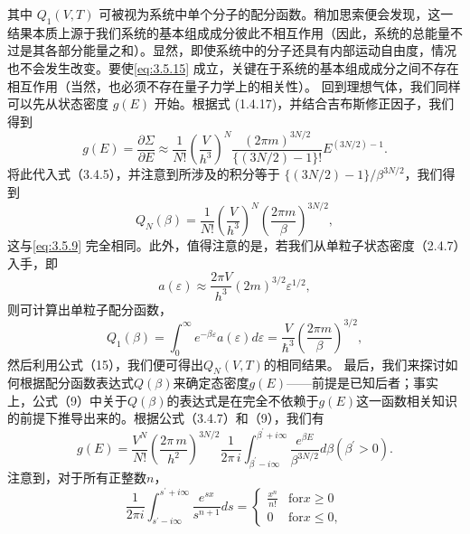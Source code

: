 其中 \(Q_{1}(V,T)\) 可被视为系统中单个分子的配分函数。稍加思索便会发现，这一结果本质上源于我们系统的基本组成成分彼此不相互作用（因此，系统的总能量不过是其各部分能量之和）。显然，即使系统中的分子还具有内部运动自由度，情况也不会发生改变。要使\autoref{eq:3.5.15} 成立，关键在于系统的基本组成成分之间不存在相互作用（当然，也必须不存在量子力学上的相关性）。
回到理想气体，我们同样可以先从状态密度 \(g(E)\) 开始。根据式 (1.4.17)，并结合吉布斯修正因子，我们得到
\begin{equation}\tag{3.5.15}\label{eq:3.5.15}
g ( E ) = \frac { \partial \Sigma } { \partial E } \approx \frac { 1 } { N ! } \left( \frac { V } { h ^{3} } \right) ^{N} \frac { ( 2 \pi m ) ^{3 N / 2} } { \{ ( 3 N / 2 ) - 1 \} ! } E ^{( 3 N / 2 ) - 1} .
\end{equation}
将此代入式（3.4.5），并注意到所涉及的积分等于 \(\{(3N/2)-1\}/\beta^{3N/2}\)，我们得到
\begin{equation}\tag{3.5.16}\label{eq:3.5.16}
Q _ { N } ( \beta ) = \frac { 1 } { N ! } \left( \frac { V } { h ^{3} } \right) ^{N} \left( \frac { 2 \pi m } { \beta } \right) ^{3 N / 2} ,
\end{equation}
这与\autoref{eq:3.5.9} 完全相同。此外，值得注意的是，若我们从单粒子状态密度（2.4.7）入手，即
\begin{equation}\tag{3.5.17}\label{eq:3.5.17}
a ( \varepsilon ) \approx \frac { 2 \pi V } { h ^{3} } ( 2 m ) ^{3 / 2} \varepsilon ^{1 / 2} ,
\end{equation}
则可计算出单粒子配分函数，
\begin{equation}\tag{3.5.18}\label{eq:3.5.18}
Q _ { 1 } ( \beta ) = \int _ { 0 } ^{\infty} e ^{- \beta \varepsilon} a ( \varepsilon ) d \varepsilon = \frac { V } { \hbar ^{3} } \left( \frac { 2 \pi m } { \beta } \right) ^{3 / 2} ,
\end{equation}
然后利用公式（15），我们便可得出\(Q_{N}(V,T)\)的相同结果。
最后，我们来探讨如何根据配分函数表达式\(Q(\beta)\)来确定态密度\(g(E)\)——前提是已知后者；事实上，公式（9）中关于\(Q(\beta)\)的表达式是在完全不依赖于\(g(E)\)这一函数相关知识的前提下推导出来的。根据公式（3.4.7）和（9），我们有
\begin{equation}\tag{3.5.19}\label{eq:3.5.19}
g ( E ) = \frac { V ^{N} } { N ! } \left( \frac { 2 \pi \, m } { h ^{2} } \right) ^{3 N / 2} \frac { 1 } { 2 \pi \, i } \int _ { \beta ^{\prime} - i \infty } ^{\beta ^ { \prime} + i \infty } \frac { e ^{\beta E} } { \beta ^{3 N / 2} } d \beta  ( \beta ^{\prime} > 0 ) .
\end{equation}
注意到，对于所有正整数\(n\)，
\begin{equation}\tag{3.5.20}\label{eq:3.5.20}
\frac { 1 } { 2 \pi i } \int _ { s ^{\prime} - i \infty } ^{s ^ { \prime} + i \infty } \frac { e ^{s x} } { s ^{n + 1} } d s = \left\{ \begin{array}{ll} { \frac { x ^{n} } { n ! } } & { \mathrm { f o r }  x \geq 0 } \\{ 0 } & { \mathrm { f o r }  x \leq 0 , } \end{array} \right.
\end{equation}

